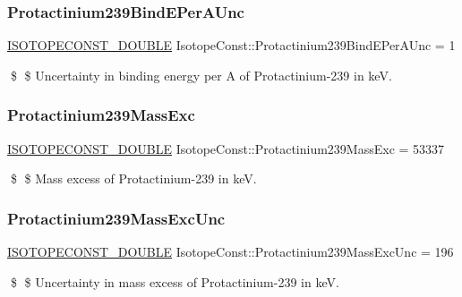 \subsubsection{\texorpdfstring{Protactinium239\+Bind\+E\+Per\+A\+Unc}{Protactinium239BindEPerAUnc}}
{\footnotesize\ttfamily \mbox{\hyperlink{group___isotope_const-_macros_ga8f45a7272ce02c0b4c65c44636ed719a}{I\+S\+O\+T\+O\+P\+E\+C\+O\+N\+S\+T\+\_\+\+D\+O\+U\+B\+LE}} Isotope\+Const\+::\+Protactinium239\+Bind\+E\+Per\+A\+Unc = 1}

\$ \$ Uncertainty in binding energy per A of Protactinium-\/239 in keV. \mbox{\label{group___isotope_const-_protactinium-_pa239_gaaf474f5b8ffc01bcc452ff3cb73be571}} 
\subsubsection{\texorpdfstring{Protactinium239\+Mass\+Exc}{Protactinium239MassExc}}
{\footnotesize\ttfamily \mbox{\hyperlink{group___isotope_const-_macros_ga8f45a7272ce02c0b4c65c44636ed719a}{I\+S\+O\+T\+O\+P\+E\+C\+O\+N\+S\+T\+\_\+\+D\+O\+U\+B\+LE}} Isotope\+Const\+::\+Protactinium239\+Mass\+Exc = 53337}

\$ \$ Mass excess of Protactinium-\/239 in keV. \mbox{\label{group___isotope_const-_protactinium-_pa239_ga14668995f0f733bf57be2bbb1528f598}} 
\subsubsection{\texorpdfstring{Protactinium239\+Mass\+Exc\+Unc}{Protactinium239MassExcUnc}}
{\footnotesize\ttfamily \mbox{\hyperlink{group___isotope_const-_macros_ga8f45a7272ce02c0b4c65c44636ed719a}{I\+S\+O\+T\+O\+P\+E\+C\+O\+N\+S\+T\+\_\+\+D\+O\+U\+B\+LE}} Isotope\+Const\+::\+Protactinium239\+Mass\+Exc\+Unc = 196}

\$ \$ Uncertainty in mass excess of Protactinium-\/239 in keV. \mbox{\label{group___isotope_const-_protactinium-_pa239_ga51a1e50f415a6b26e1d7cf7092631bc5}} 

